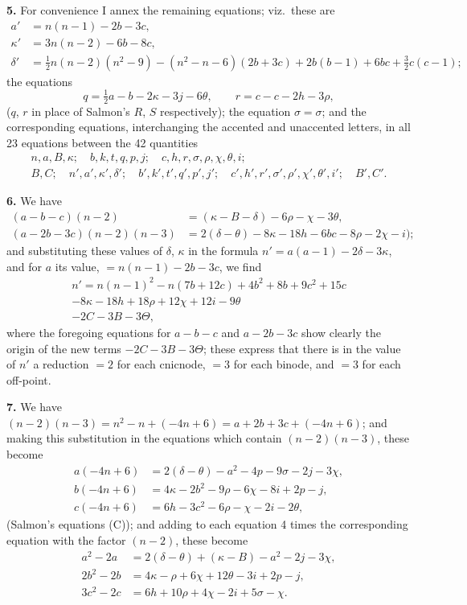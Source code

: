 \documentclass[11pt,a4paper]{article}
\begin{document}
\textbf{5.} For convenience I annex the remaining equations; viz.\ these are
\begin{align*}
a' &= n(n-1) - 2b - 3c, \\
\kappa' &= 3n(n-2) - 6b - 8c, \\
\delta' &= \tfrac{1}{2}n(n-2)(n^2-9) - (n^2-n-6)(2b+3c) + 2b(b-1) + 6bc + \tfrac{3}{2}c(c-1);
\end{align*}
the equations
\[
q = \tfrac{1}{2}a - b - 2\kappa - 3j - 6\theta, \qquad r = c - c - 2h - 3\rho,
\]
($q$, $r$ in place of Salmon's $R$, $S$ respectively); the equation $\sigma = \sigma$; and the corresponding equations, interchanging the accented and unaccented letters, in all 23 equations between the 42 quantities
\begin{multline*}
n, a, B, \kappa; \quad b, k, t, q, p, j; \quad c, h, r, \sigma, \rho, \chi, \theta, i; \\
B, C; \quad n', a', \kappa', \delta'; \quad b', k', t', q', p', j'; \quad c', h', r', \sigma', \rho', \chi', \theta', i'; \quad B', C'.
\end{multline*}

\textbf{6.} We have
\begin{align*}
(a - b - c)(n-2) &= (\kappa - B - \delta) - 6\rho - \chi - 3\theta, \\
(a - 2b - 3c)(n-2)(n-3) &= 2(\delta - \theta) - 8\kappa - 18h - 6bc - 8\rho - 2\chi - i);
\end{align*}
and substituting these values of $\delta$, $\kappa$ in the formula $n' = a(a-1) - 2\delta - 3\kappa$, and for $a$ its value, $= n(n-1) - 2b - 3c$, we find
\begin{multline*}
n' = n(n-1)^2 - n(7b + 12c) + 4b^2 + 8b + 9c^2 + 15c \\
- 8\kappa - 18h + 18\rho + 12\chi + 12i - 9\theta \\
- 2C - 3B - 3\Theta,
\end{multline*}
where the foregoing equations for $a - b - c$ and $a - 2b - 3c$ show clearly the origin of the new terms $-2C - 3B - 3\Theta$; these express that there is in the value of $n'$ a reduction $=2$ for each cnicnode, $=3$ for each binode, and $=3$ for each off-point.

\textbf{7.} We have $(n-2)(n-3) = n^2 - n + (-4n + 6) = a + 2b + 3c + (-4n + 6)$; and making this substitution in the equations which contain $(n-2)(n-3)$, these become
\begin{align*}
a(-4n+6) &= 2(\delta - \theta) - a^2 - 4p - 9\sigma - 2j - 3\chi, \\
b(-4n+6) &= 4\kappa - 2b^2 - 9\rho - 6\chi - 8i + 2p - j, \\
c(-4n+6) &= 6h - 3c^2 - 6\rho - \chi - 2i - 2\theta,
\end{align*}
(Salmon's equations (C)); and adding to each equation 4 times the corresponding equation with the factor $(n-2)$, these become
\begin{align*}
a^2 - 2a &= 2(\delta - \theta) + (\kappa - B) - a^2 - 2j - 3\chi, \\
2b^2 - 2b &= 4\kappa - \rho + 6\chi + 12\theta - 3i + 2p - j, \\
3c^2 - 2c &= 6h + 10\rho + 4\chi - 2i + 5\sigma - \chi.
\end{align*}
\end{document}
